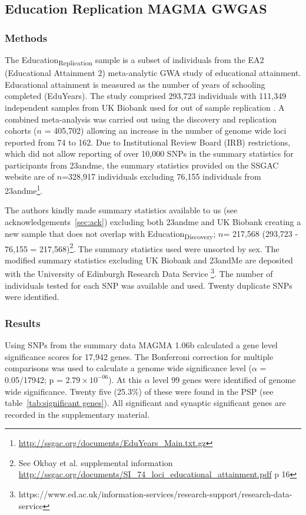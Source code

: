 \subsection{Education Replication MAGMA GWGAS}
\label{sec:Edcuation replication gwgas}
\subsubsection{Methods}

The Education\textsubscript{Replication} sample is a subset of individuals from the EA2 (Educational Attainment 2) meta-analytic GWA study of educational attainment\cite{okbay2016genome}. Educational attainment is measured as the number of years of schooling completed (EduYears).  The study comprised 293,723 individuals with 111,349 independent samples from UK Biobank used for out of sample replication \cite{sudlow2015uk}. A combined meta-analysis was carried out using the discovery and replication cohorts ($n$ = 405,702) allowing an increase in the number of genome wide loci reported from 74 to 162. Due to Institutional Review Board (IRB) restrictions, which did not allow reporting of over 10,000 SNPs in the summary statistics for participants from 23andme, the summary statistics provided on the SSGAC website are of $n$=328,917 individuals excluding 76,155 individuals from 23andme\footnote{\url{http://ssgac.org/documents/EduYears_Main.txt.gz}}.

The authors kindly made summary statistics available to us (see acknowledgements~\ref{sec:ack}) excluding both 23andme and UK Biobank creating a new sample that does not overlap with Education\textsubscript{Discovery}; $n$= 217,568 (293,723 - 76,155 = 217,568)\cite{okbay2016genome}\footnote{See Okbay et al. supplemental information \url{http://ssgac.org/documents/SI_74_loci_educational_attainment.pdf} p 16}. The summary statistics used were unsorted by sex. The modified summary statistics excluding UK Biobank and 23andMe  are deposited with the University of Edinburgh Research Data Service \footnote{https://www.ed.ac.uk/information-services/research-support/research-data-service}.
The number of individuals tested for each SNP was available and used. Twenty duplicate SNPs were identified. 

\subsubsection{Results}


 Using SNPs from the summary data MAGMA 1.06b calculated a gene level significance scores for 17,942 genes. The Bonferroni correction for multiple comparisons was used to calculate a genome wide significance level ($\alpha$ = 0.05/17942; p = $2.79 \times 10^{-06}$). At this $\alpha$ level 99 genes were identified of genome wide significance. Twenty five (25.3\%) of these were found in the PSP (see table~\ref{tab:significant genes}). All significant and synaptic significant genes are recorded in the supplementary material. 



